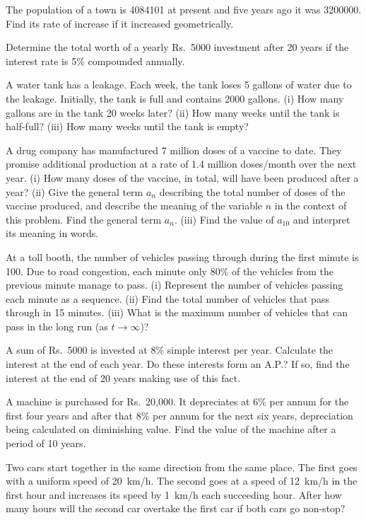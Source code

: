 \documentclass[11pt,a4paper]{article}
\begin{document}
\begin{longlist}
\item The population of a town is 4084101 at present and five years ago it was 3200000. Find its rate of increase if it increased geometrically.

\item Determine the total worth of a yearly Rs.~5000 investment after 20 years if the interest rate is 5\% compounded annually.

\item A water tank has a leakage. Each week, the tank loses 5 gallons of water due to the leakage. Initially, the tank is full and contains 2000 gallons. (i) How many gallons are in the tank 20 weeks later? (ii) How many weeks until the tank is half-full? (iii) How many weeks until the tank is empty?

\item A drug company has manufactured 7 million doses of a vaccine to date. They promise additional production at a rate of 1.4 million doses/month over the next year. (i) How many doses of the vaccine, in total, will have been produced after a year? (ii) Give the general term $a_n$ describing the total number of doses of the vaccine produced, and describe the meaning of the variable $n$ in the context of this problem. Find the general term $a_n$. (iii) Find the value of $a_{10}$ and interpret its meaning in words.

\item At a toll booth, the number of vehicles passing through during the first minute is 100. Due to road congestion, each minute only 80\% of the vehicles from the previous minute manage to pass. (i) Represent the number of vehicles passing each minute as a sequence. (ii) Find the total number of vehicles that pass through in 15 minutes. (iii) What is the maximum number of vehicles that can pass in the long run (as $t\to\infty$)?

\item A sum of Rs.~5000 is invested at 8\% simple interest per year. Calculate the interest at the end of each year. Do these interests form an A.P.? If so, find the interest at the end of 20 years making use of this fact.

\item A machine is purchased for Rs.~20,000. It depreciates at 6\% per annum for the first four years and after that 8\% per annum for the next six years, depreciation being calculated on diminishing value. Find the value of the machine after a period of 10 years.

\item Two cars start together in the same direction from the same place. The first goes with a uniform speed of 20~km/h. The second goes at a speed of 12~km/h in the first hour and increases its speed by 1~km/h each succeeding hour. After how many hours will the second car overtake the first car if both cars go non-stop?


\end{longlist}
\end{document}
